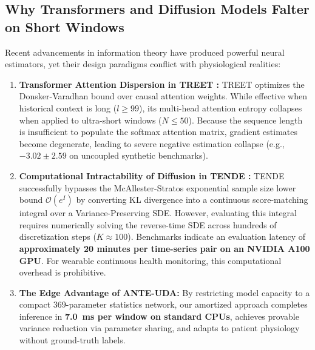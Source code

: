 \subsection{Why Transformers and Diffusion Models Falter on Short Windows}
Recent advancements in information theory have produced powerful neural estimators, yet their design paradigms conflict with physiological realities:
\begin{enumerate}
    \item \textbf{Transformer Attention Dispersion in TREET \cite{treet2024}:} TREET optimizes the Donsker-Varadhan bound over causal attention weights. While effective when historical context is long ($l \ge 99$), its multi-head attention entropy collapses when applied to ultra-short windows ($N \le 50$). Because the sequence length is insufficient to populate the softmax attention matrix, gradient estimates become degenerate, leading to severe negative estimation collapse (e.g., $-3.02 \pm 2.59$ on uncoupled synthetic benchmarks).
    \item \textbf{Computational Intractability of Diffusion in TENDE \cite{tende2025}:} TENDE successfully bypasses the McAllester-Stratos exponential sample size lower bound $\mathcal{O}(e^I)$ \cite{mcallester2020formal} by converting KL divergence into a continuous score-matching integral over a Variance-Preserving SDE. However, evaluating this integral requires numerically solving the reverse-time SDE across hundreds of discretization steps ($K \approx 100$). Benchmarks indicate an evaluation latency of \textbf{approximately 20 minutes per time-series pair on an NVIDIA A100 GPU}. For wearable continuous health monitoring, this computational overhead is prohibitive.
    \item \textbf{The Edge Advantage of ANTE-UDA:} By restricting model capacity to a compact 369-parameter statistics network, our amortized approach completes inference in \textbf{7.0~ms per window on standard CPUs}, achieves provable variance reduction via parameter sharing, and adapts to patient physiology without ground-truth labels.
\end{enumerate}

